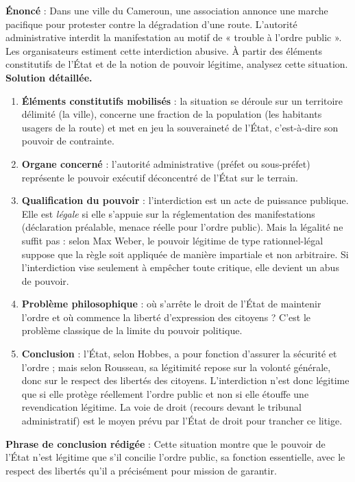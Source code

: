 \documentclass[11pt]{article}
\newcommand{\cle}[1]{{\popxbold\color{popdark}#1}}
\begin{document}
\begin{exoresolu}
\textbf{Énoncé} : Dans une ville du Cameroun, une association annonce une marche pacifique pour protester contre la dégradation d'une route. L'autorité administrative interdit la manifestation au motif de « trouble à l'ordre public ». Les organisateurs estiment cette interdiction abusive. À partir des éléments constitutifs de l'État et de la notion de pouvoir légitime, analysez cette situation.
\tcblower
\textbf{Solution détaillée.}
\begin{enumerate}
\item \textbf{Éléments constitutifs mobilisés} : la situation se déroule sur un \cle{territoire} délimité (la ville), concerne une fraction de la \cle{population} (les habitants usagers de la route) et met en jeu la \cle{souveraineté} de l'État, c'est-à-dire son pouvoir de contrainte.
\item \textbf{Organe concerné} : l'autorité administrative (préfet ou sous-préfet) représente le pouvoir \cle{exécutif} déconcentré de l'État sur le terrain.
\item \textbf{Qualification du pouvoir} : l'interdiction est un acte de puissance publique. Elle est \emph{légale} si elle s'appuie sur la réglementation des manifestations (déclaration préalable, menace réelle pour l'ordre public). Mais la légalité ne suffit pas : selon Max Weber, le pouvoir légitime de type \cle{rationnel-légal} suppose que la règle soit appliquée de manière impartiale et non arbitraire. Si l'interdiction vise seulement à empêcher toute critique, elle devient un abus de pouvoir.
\item \textbf{Problème philosophique} : où s'arrête le droit de l'État de maintenir l'ordre et où commence la liberté d'expression des citoyens ? C'est le problème classique de la limite du pouvoir politique.
\item \textbf{Conclusion} : l'État, selon Hobbes, a pour fonction d'assurer la sécurité et l'ordre ; mais selon Rousseau, sa légitimité repose sur la volonté générale, donc sur le respect des libertés des citoyens. L'interdiction n'est donc légitime que si elle protège réellement l'ordre public et non si elle étouffe une revendication légitime. La voie de droit (recours devant le tribunal administratif) est le moyen prévu par l'État de droit pour trancher ce litige.
\end{enumerate}
\textbf{Phrase de conclusion rédigée} : Cette situation montre que le pouvoir de l'État n'est légitime que s'il concilie l'ordre public, sa fonction essentielle, avec le respect des libertés qu'il a précisément pour mission de garantir.
\end{exoresolu}
\end{document}
